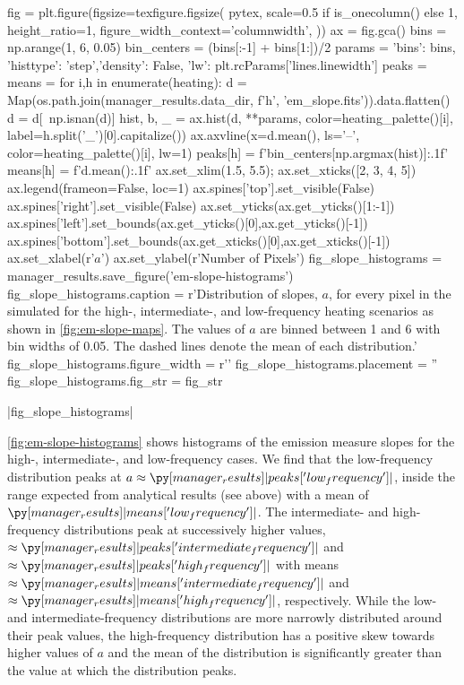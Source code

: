 \begin{pycode}
fig = plt.figure(figsize=texfigure.figsize(
    pytex,
    scale=0.5 if is_onecolumn() else 1,
    height_ratio=1,
    figure_width_context='columnwidth',
))
ax = fig.gca()
bins = np.arange(1, 6, 0.05)
bin_centers = (bins[:-1] + bins[1:])/2
params = {'bins': bins, 'histtype': 'step','density': False, 
          'lw': plt.rcParams['lines.linewidth']}
peaks = {}
means = {}
for i,h in enumerate(heating):
    d = Map(os.path.join(manager_results.data_dir, f'{h}', 'em_slope.fits')).data.flatten()
    d = d[~np.isnan(d)]
    hist, b, _ = ax.hist(d, **params, color=heating_palette()[i],
                         label=h.split('_')[0].capitalize())
    ax.axvline(x=d.mean(), ls='--', color=heating_palette()[i], lw=1)
    peaks[h] = f'{bin_centers[np.argmax(hist)]:.1f}'
    means[h] = f'{d.mean():.1f}'
ax.set_xlim(1.5, 5.5);
ax.set_xticks([2, 3, 4, 5])
ax.legend(frameon=False, loc=1)
ax.spines['top'].set_visible(False)
ax.spines['right'].set_visible(False)
ax.set_yticks(ax.get_yticks()[1:-1])
ax.spines['left'].set_bounds(ax.get_yticks()[0],ax.get_yticks()[-1])
ax.spines['bottom'].set_bounds(ax.get_xticks()[0],ax.get_xticks()[-1])
ax.set_xlabel(r'$a$')
ax.set_ylabel(r'Number of Pixels')
fig_slope_histograms = manager_results.save_figure('em-slope-histograms')
fig_slope_histograms.caption = r'Distribution of \dem{} slopes, $a$, for every pixel in the simulated \AR{} for the high-, intermediate-, and low-frequency heating scenarios as shown in \autoref{fig:em-slope-maps}. The values of $a$ are binned between 1 and 6 with bin widths of 0.05. The dashed lines denote the mean of each distribution.'
fig_slope_histograms.figure_width = r'\columnwidth'
fig_slope_histograms.placement = ''
fig_slope_histograms.fig_str = fig_str
\end{pycode}
|fig_slope_histograms|

\autoref{fig:em-slope-histograms} shows histograms of the emission measure slopes for the high-, intermediate-, and low-frequency cases. We find that the low-frequency distribution peaks at $a\approx\py[manager_results]|peaks['low_frequency']|$, inside the range expected from analytical results (see above) with a mean of $\py[manager_results]|means['low_frequency']|$. The intermediate- and high-frequency distributions peak at successively higher values, $\approx\py[manager_results]|peaks['intermediate_frequency']|$ and $\approx\py[manager_results]|peaks['high_frequency']|$ with means $\approx\py[manager_results]|means['intermediate_frequency']|$ and $\approx\py[manager_results]|means['high_frequency']|$, respectively. While the low- and intermediate-frequency distributions are more narrowly distributed around their peak values, the high-frequency distribution has a positive skew towards higher values of $a$ and the mean of the distribution is significantly greater than the value at which the distribution peaks.

